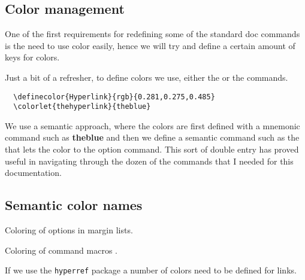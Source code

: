 \def\meta@font@select{\upshape\color{teal}}


\subsection{Color management}
One of the first requirements for redefining some of the standard doc commands is the need to use color easily, hence we will try and define a certain amount of keys for colors.

Just a bit of a refresher, to define colors we use, either the  or the  commands.

\begin{tcolorbox}
\begin{lstlisting}
  \definecolor{Hyperlink}{rgb}{0.281,0.275,0.485}
  \colorlet{thehyperlink}{theblue}
\end{lstlisting}
\end{tcolorbox}

We use a semantic approach, where the colors are first defined with a mnemonic command such as {\bfseries\textcolor{theblue}{theblue}} and then we define a semantic command such as the that lets the color to the option command. This sort of double entry has proved useful in navigating through the dozen of the commands that I needed for this documentation.


\subsection{Semantic color names}
\begin{marglist}
\item [\option{theoption}] Coloring of options in margin lists.
\item [\option{themacro}] Coloring of command macros .
\item [\option{hyperlink}] If we use the \texttt{hyperref} package a number of colors need to be defined for links.
\end{marglist}

